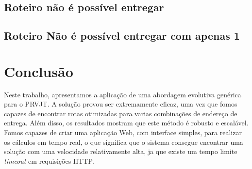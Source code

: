 \subsection{Roteiro não é possível entregar}
\begin{center}
	\label{fig:RoteiroNaoepossivelentregar}
\end{center}




\subsection{Roteiro Não é possível entregar com apenas 1}
\begin{center}
	\label{fig:RoteiroNaoepossivelentregarcomapenas1}
\end{center}

\section{Conclusão}

Neste trabalho, apresentamos a aplicação de uma abordagem evolutiva genérica para o PRVJT. A solução provou ser extremamente eficaz, uma vez que fomos capazes de encontrar rotas otimizadas para varias combinações de endereço de entrega. Além disso, os resultados mostram que este método é robusto e escalável. 
Fomos capazes de criar uma aplicação Web, com interface simples, para realizar os cálculos em tempo real, o que significa que o sistema consegue encontrar uma solução com uma velocidade relativamente alta, ja que existe um tempo limite \textit{timeout} em requisições HTTP.

